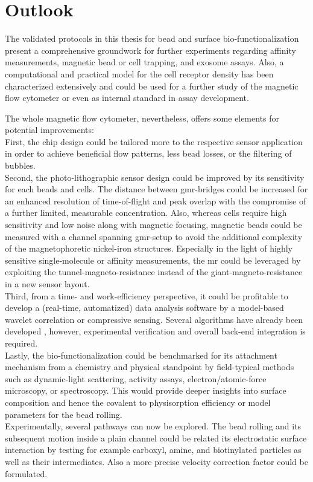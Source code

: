 \chapter{Outlook}
The validated protocols in this thesis for bead and surface bio-functionalization present a comprehensive groundwork for further experiments regarding affinity measurements, magnetic bead or cell trapping, and exosome assays. Also, a computational and practical model for the cell receptor density has been characterized extensively and could be used for a further study of the magnetic flow cytometer or even as internal standard in assay development. 

The whole magnetic flow cytometer, nevertheless, offers some elements for potential improvements: \\
First, the chip design could be tailored more to the respective sensor application in order to achieve beneficial flow patterns, less bead losses, or the filtering of bubbles.\\
Second, the photo-lithographic sensor design could be improved by its sensitivity for each beads and cells. The distance between \gls{gmr}-bridges could be increased for an enhanced resolution of time-of-flight and peak overlap with the compromise of a further limited, measurable concentration. Also, whereas cells require high sensitivity and low noise along with magnetic focusing, magnetic beads could be measured with a channel spanning \gls{gmr}-setup to avoid the additional complexity of the magnetophoretic nickel-iron structures. Especially in the light of highly sensitive single-molecule or affinity measurements, the \acrlong{mr} could be leveraged by exploiting the tunnel-magneto-resistance instead of the giant-magneto-resistance in a new sensor layout.\cite{lit:GMRTMR}\\
Third, from a time- and work-efficiency perspective, it could be profitable to develop a (real-time, automatized) data analysis software by a model-based wavelet correlation or compressive sensing. Several algorithms have already been developed \cite{lit:thes:michaelBauer}, however, experimental verification and overall back-end integration is required.\\
Lastly, the bio-functionalization could be benchmarked for its attachment mechanism from a chemistry and physical standpoint by field-typical methods such as dynamic-light scattering, activity assays, electron/atomic-force microscopy, or spectroscopy. This would provide deeper insights into surface composition and hence the covalent to physisorption efficiency or model parameters for the bead rolling.\\
Experimentally, several pathways can now be explored. The bead rolling and its subsequent motion inside a plain channel could be related its electrostatic surface interaction by testing for example \gls{carboxyl}, \gls{amine}, and biotinylated particles as well as their intermediates. Also a more precise velocity correction factor could be formulated.\\

